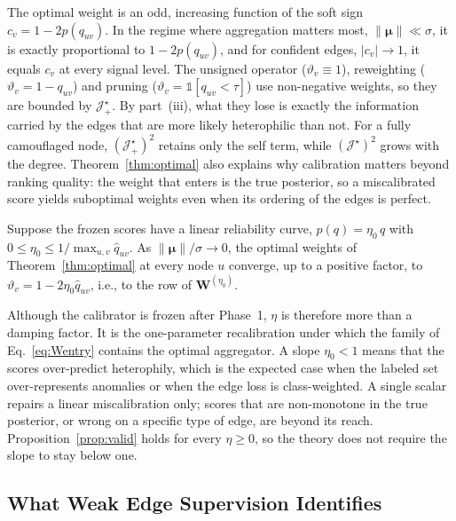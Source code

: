 The optimal weight is an odd, increasing function of the soft sign $c_v=1-2p(q_{uv})$.
In the regime where aggregation matters most, $\|\bm\mu\|\ll\sigma$, it is exactly proportional to $1-2p(q_{uv})$, and for confident edges, $|c_v|\to1$, it equals $c_v$ at every signal level.
The unsigned operator ($\vartheta_v\equiv1$), reweighting ($\vartheta_v=1-q_{uv}$) and pruning ($\vartheta_v=\mathds{1}[q_{uv}<\tau]$) use non-negative weights, so they are bounded by $\mathcal J^\star_+$.
By part~(iii), what they lose is exactly the information carried by the edges that are more likely heterophilic than not.
For a fully camouflaged node, $(\mathcal J^\star_+)^2$ retains only the self term, while $(\mathcal J^\star)^2$ grows with the degree.
Theorem~\ref{thm:optimal} also explains why calibration matters beyond ranking quality: the weight that enters is the true posterior, so a miscalibrated score yields suboptimal weights even when its ordering of the edges is perfect.

\begin{corollary}\label{cor:slope}
Suppose the frozen scores have a linear reliability curve, $p(q)=\eta_0\,q$ with $0\le\eta_0\le1/\max_{u,v}\hat q_{uv}$.
As $\|\bm\mu\|/\sigma\to0$, the optimal weights of Theorem~\ref{thm:optimal} at every node $u$ converge, up to a positive factor, to $\vartheta_v=1-2\eta_0\hat q_{uv}$, i.e., to the row of $\bm W^{(\eta_0)}$.
\end{corollary}

Although the calibrator is frozen after Phase~1, $\eta$ is therefore more than a damping factor.
It is the one-parameter recalibration under which the family of Eq.~\eqref{eq:Wentry} contains the optimal aggregator.
A slope $\eta_0<1$ means that the scores over-predict heterophily, which is the expected case when the labeled set over-represents anomalies or when the edge loss is class-weighted.
A single scalar repairs a linear miscalibration only; scores that are non-monotone in the true posterior, or wrong on a specific type of edge, are beyond its reach.
Proposition~\ref{prop:valid} holds for every $\eta\ge0$, so the theory does not require the slope to stay below one.

\subsection{What Weak Edge Supervision Identifies}\label{sec:theory-supervision}


